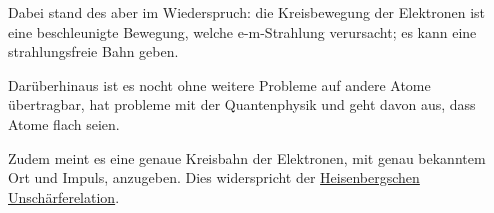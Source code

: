 \documentclass{article}
\begin{document}
Dabei stand des aber im Wiederspruch: die Kreisbewegung der Elektronen ist eine beschleunigte Bewegung, welche e-m-Strahlung verursacht; es kann eine strahlungsfreie Bahn geben.
 
Darüberhinaus ist es nocht ohne weitere Probleme auf andere Atome übertragbar, hat probleme mit der Quantenphysik und geht davon aus, dass Atome flach seien. 
 
Zudem meint es eine genaue Kreisbahn der Elektronen, mit genau bekanntem Ort und Impuls, anzugeben. Dies widerspricht der \hyperref[Heisenbergsche Unschärferelation]{Heisenbergschen Unschärferelation}.
\end{document}
